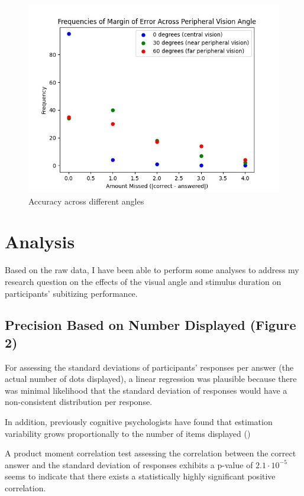 \documentclass[12pt]{article}
\begin{document}
\begin{figure} [p]
\centering
\includegraphics[scale=0.4]{angle.jpg}
\caption{Accuracy across different angles}
\end{figure}

\newpage
\section{Analysis}

Based on the raw data, I have been able to perform some analyses to address my
research question on the effects of the visual angle and stimulus duration on
participants’ subitizing performance. 

\subsection{Precision Based on Number Displayed (Figure 2)}

For assessing the standard deviations of participants' responses per answer
(the actual number of dots displayed), a linear regression was plausible
because there was minimal likelihood that the standard deviation of responses
would have a non-consistent distribution per response.

In addition, previously cognitive psychologists have found that estimation
variability grows proportionally to the number of items displayed (\cite{prop})

A product moment correlation test assessing the correlation between the correct
answer and the standard deviation of responses exhibits a p-value of $2.1 \cdot
10^{-5}$ seems to indicate that there exists a statistically highly significant
positive correlation.
\end{document}
